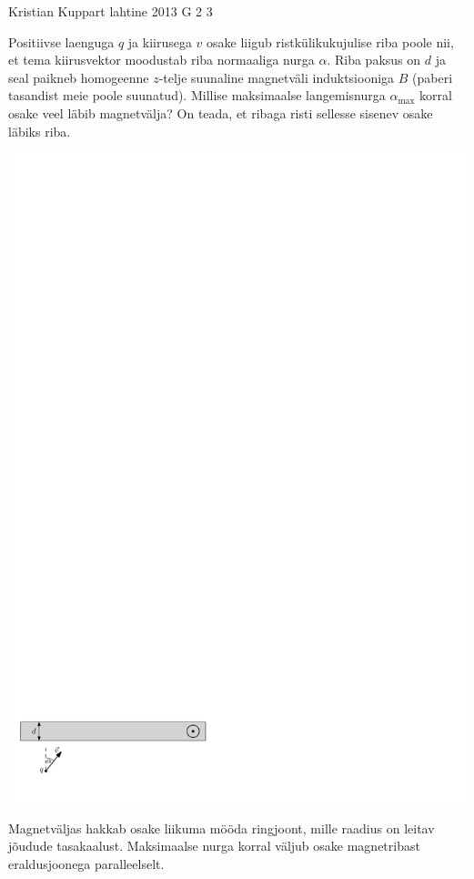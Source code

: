 {Kristian Kuppart} %
{lahtine} %
{2013} %
{G 2} %
{3} %
{
\ifStatement
Positiivse laenguga $q$ ja kiirusega $v$ osake liigub ristkülikukujulise riba poole nii, et tema kiirusvektor
moodustab riba normaaliga nurga $\alpha$. Riba paksus on $d$ ja seal paikneb
homogeenne $z$-telje suunaline
magnetväli induktsiooniga $B$ (paberi tasandist meie poole suunatud). Millise maksimaalse
langemisnurga $\alpha_{\mathrm{max}}$ korral
osake veel läbib magnetvälja? On teada, et ribaga risti sellesse sisenev osake
läbiks riba.

\begin{center}
\includegraphics[width=\linewidth]{2013-lahg-02-magnetpeegeljoonis_ipe}
\end{center}
\fi


\ifHint
Magnetväljas hakkab osake liikuma mööda ringjoont, mille raadius on leitav jõudude tasakaalust. Maksimaalse nurga korral väljub osake magnetribast eraldusjoonega paralleelselt.
\fi


}
